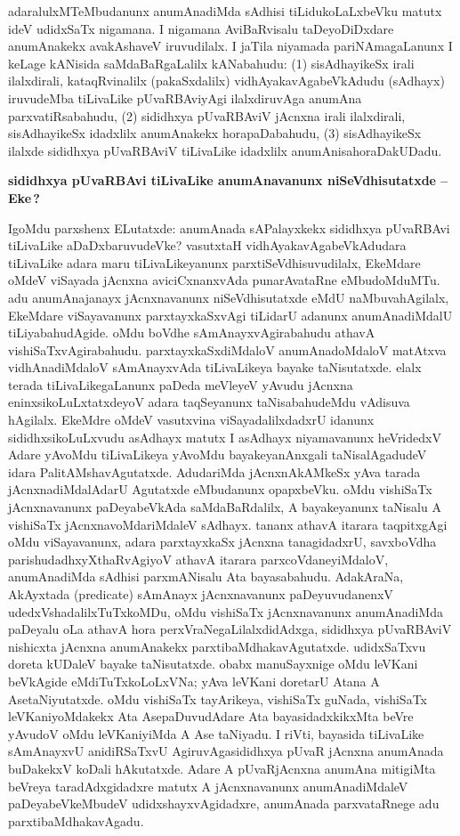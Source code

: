 adaralulxMTeMbudanunx anumAnadiMda sAdhisi tiLidukoLaLxbeVku matutx ideV udidxSaTx nigamana. I nigamana AviBaRvisalu taDeyoDiDxdare anumAnakekx avakAshaveV iruvudilalx. I jaTila niyamada pariNAmagaLanunx I keLage kANisida saMdaBaRgaLalilx kANabahudu: (1) sisAdhayikeSx irali ilalxdirali, kataqRvinalilx (pakaSxdalilx) vidhAyakavAgabeVkAdudu (sAdhayx) iruvudeMba tiLivaLike pUvaRBAviyAgi ilalxdiruvAga anumAna parxvatiRsabahudu, (2) sididhxya pUvaRBAviV jAcnxna irali ilalxdirali, sisAdhayikeSx idadxlilx anumAnakekx horapaDabahudu, (3) sisAdhayikeSx ilalxde sididhxya pUvaRBAviV tiLivaLike idadxlilx anumAnisahoraDakUDadu.

\bigskip
\begin{center}
{\Large\bf sididhxya pUvaRBAvi tiLivaLike anumAnavanunx niSeVdhisutatxde -- Eke\,?}
\end{center}

IgoMdu parxshenx ELutatxde: anumAnada sAPalayxkekx sididhxya pUvaRBAvi tiLi\-vaLike aDaDxbaruvudeVke? vasutxtaH vidhAyakavAgabeVkAdudara tiLivaLike adara maru tiLi\-vaLikeyanunx parxtiSeVdhisuvudilalx, EkeMdare oMdeV viSayada jAcnxna aviciCxnanxvAda puna\-rA\-vataRne eMbudoMduMTu. adu anumAnajanayx jAcnxnavanunx niSeVdhisutatxde eMdU naMbuvahAgilalx, EkeMdare viSayavanunx parxtayxkaSxvAgi tiLidarU adanunx anumAna\break\-diMdalU tiLiyabahudAgide. oMdu boVdhe sAmAnayxvAgirabahudu athavA vishiSaTx\-vAgirabahudu. parxtayxkaSxdiMdaloV anumAnadoMdaloV matAtxva vidhAnadiMdaloV sAmAnayxvAda tiLivaLikeya bayake taNisutatxde. elalx terada tiLivaLikegaLanunx paDeda meVleyeV yAvudu jAcnxna eninxsikoLuLxtatxdeyoV adara taqSeyanunx taNisabahudeMdu vAdisuva hAgilalx. EkeMdre oMdeV vasutxvina viSayadalilxdadxrU idanunx sididhxsi\-koLuLx\-vudu asAdhayx matutx I asAdhayx niyamavanunx heVridedxV Adare yAvoMdu tiLi\-vaLikeya yAvoMdu bayakeyanAnxgali taNisalAgadudeV idara PalitAMshavAgutatxde. Aduda\-riMda jAcnxnAkAMkeSx yAva tarada jAcnxnadiMdalAdarU Agutatxde eMbudanunx opapxbeVku. oMdu vishiSaTx jAcnxnavanunx paDeyabeVkAda saMdaBaRdalilx, A bayakeyanunx taNisalu A vishiSaTx jAcnxnavoMdariMdaleV sAdhayx. tananx athavA itarara taqpitxgAgi oMdu viSaya\-vanunx, adara parxtayxkaSx jAcnxna tanagidadxrU, savxboVdha parishudadhxyXthaRvAgiyoV athavA itarara parxcoVdaneyiMdaloV, anumAnadiMda sAdhisi parxmANisalu Ata bayasabahudu. AdakAraNa, AkAyxtada {\rm(predicate)} sAmAnayx jAcnxnavanunx paDeyuvudanenxV udedxVsha\-dalilxTuTxkoMDu, oMdu vishiSaTx jAcnxnavanunx anumAnadiMda paDeyalu oLa athavA hora perxVraNegaLilalxdidAdxga, sididhxya pUvaRBAviV nishicxta jAcnxna anumAnakekx parxtibaMdhaka\-vAgutatxde. udidxSaTxvu doreta kUDaleV bayake taNisutatxde. obabx manuSayxnige oMdu leVKani beVkAgide eMdiTuTxkoLoLxVNa; yAva leVKani doretarU Atana A Ase\break taNiyu\-tatxde. oMdu vishiSaTx tayArikeya, vishiSaTx guNada, vishiSaTx leVKaniyoMdakekx Ata AsepaDuvudAdare Ata bayasidadxkikxMta beVre yAvudoV oMdu leVKani\-yiMda A Ase taNiyadu. I riVti, bayasida tiLivaLike sAmAnayxvU anidiRSaTxvU AgiruvAga\break sididhxya pUvaR jAcnxna anumAnada buDakekxV koDali hAkutatxde. Adare A pUvaR\-jAcnxna anumAna mitigiMta beVreya taradAdxgidadxre matutx A jAcnxnavanunx anumAnadiMdaleV paDeyabeVkeMbudeV udidxshayxvAgidadxre, anumAnada parxvataRnege adu parxtibaMdhaka\break\-vAgadu.

